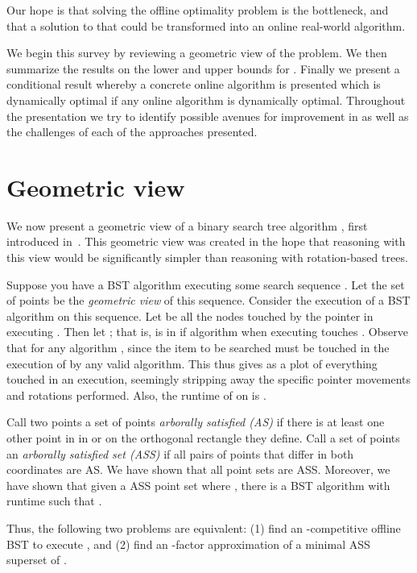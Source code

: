 \documentclass[11pt]{article}
\begin{document}
Our hope is that solving the offline optimality problem is the bottleneck, and that a solution to that could be transformed into an online real-world algorithm.


We begin this survey by reviewing a geometric view of the problem. We then summarize the results on the lower and upper bounds for . Finally we present a conditional result whereby a concrete online algorithm is presented which is dynamically optimal if any online algorithm is dynamically optimal. Throughout the presentation we try to identify possible avenues for improvement in as well as the challenges of each of the approaches presented.

\section{Geometric view}








We now present a geometric view of a binary search tree algorithm , first introduced in~\cite{DBLP:conf/soda/DemaineHIKP09}. This geometric view was created in the hope that reasoning with this view would be significantly simpler than reasoning with rotation-based trees.

Suppose you have a BST algorithm executing some search sequence . Let the set of points  be the \emph{geometric view} of this sequence. Consider the execution of a BST algorithm  on this sequence. Let  be all the nodes touched by the pointer in executing . Then let ; that is,  is in  if algorithm  when executing  touches . Observe that  for any algorithm , since the item to be searched must be touched in the execution of  by any valid algorithm. This thus gives  as a plot of everything touched in an execution, seemingly stripping away the specific pointer movements and rotations performed. Also, the runtime of  on  is .

Call two points  a set of points  \emph{arborally satisfied (AS)} if there is at least one other point in  in or on the orthogonal rectangle they define. Call 
a set of points  an \emph{arborally satisfied set (ASS)} if all pairs of points  that differ in both coordinates are AS.
We have shown that all point sets  are ASS. Moreover, we have shown that given a ASS point set  where , there is a BST algorithm  with runtime  such that . 

Thus, the following two problems are equivalent: (1) find an -competitive offline BST to execute , and (2) find an -factor approximation of a minimal ASS superset of .
\end{document}
